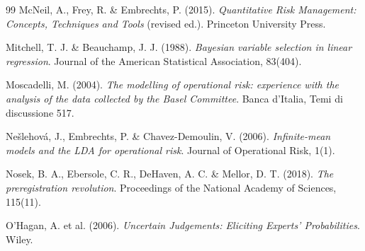 \documentclass[11pt]{article}
\begin{document}
\begin{thebibliography}{99}
McNeil, A., Frey, R. \& Embrechts, P. (2015).
\textit{Quantitative Risk Management: Concepts, Techniques and Tools}
(revised ed.). Princeton University Press.

Mitchell, T. J. \& Beauchamp, J. J. (1988).
\textit{Bayesian variable selection in linear regression}. Journal of the
American Statistical Association, 83(404).

Moscadelli, M. (2004).
\textit{The modelling of operational risk: experience with the analysis of
the data collected by the Basel Committee}. Banca d'Italia, Temi di
discussione 517.

Ne\v{s}lehov\'a, J., Embrechts, P. \& Chavez-Demoulin, V. (2006).
\textit{Infinite-mean models and the LDA for operational risk}. Journal of
Operational Risk, 1(1).

Nosek, B. A., Ebersole, C. R., DeHaven, A. C. \& Mellor, D. T. (2018).
\textit{The preregistration revolution}. Proceedings of the National
Academy of Sciences, 115(11).

O'Hagan, A. et al. (2006).
\textit{Uncertain Judgements: Eliciting Experts' Probabilities}. Wiley.

\end{thebibliography}
\end{document}
